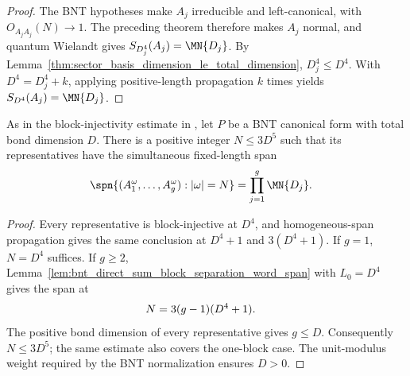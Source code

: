 \begin{proof}
    \leanok
    The BNT hypotheses make $A_j$ irreducible and left-canonical, with
    $O_{A_jA_j}(N)\to1$. The preceding theorem therefore makes $A_j$ normal,
    and quantum Wielandt gives $S_{D_j^4}(A_j)=\MN{D_j}$.
    By Lemma~\ref{thm:sector_basis_dimension_le_total_dimension},
    $D_j^4\leq D^4$. With $D^4=D_j^4+k$, applying positive-length
    propagation $k$ times yields $S_{D^4}(A_j)=\MN{D_j}$.
\end{proof}

\begin{lemma}
    \label{thm:sharp_bnt_block_separation}
    \leanok
    As in the block-injectivity estimate in
    \cite[lines~340--345]{Cirac2016MPDO_arXiv}, let $P$ be a BNT canonical
    form with total bond dimension $D$. There is a positive integer $N\leq3D^5$
    such that its representatives have the simultaneous fixed-length span
    \begin{align}
        \spn\{(A_1^\omega,\ldots,A_g^\omega):|\omega|=N\}
         & =\prod_{j=1}^{g}\MN{D_j}.
        \notag
    \end{align}
\end{lemma}

\begin{proof}
    \leanok
    Every representative is block-injective at $D^4$, and homogeneous-span
    propagation gives the same conclusion at $D^4+1$ and $3(D^4+1)$. If
    $g=1$, $N=D^4$ suffices. If $g\geq2$,
    Lemma~\ref{lem:bnt_direct_sum_block_separation_word_span} with $L_0=D^4$
    gives the span at
    \begin{align}
        N & =3(g-1)(D^4+1).
        \notag
    \end{align}
    The positive bond dimension of every representative gives $g\leq D$.
    Consequently $N\leq3D^5$; the same estimate also covers the one-block
    case. The unit-modulus weight required by the BNT normalization ensures
    $D>0$.
\end{proof}


